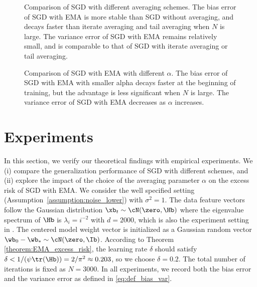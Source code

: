 \documentclass[11pt]{article}
\begin{document}
\begin{figure}[ht]
\centering
{}
\caption{Comparison of SGD with different averaging schemes. The bias error of SGD with EMA is more stable than SGD without averaging, and decays faster than iterate averaging and tail averaging when $N$ is large. The variance error of SGD with EMA remains relatively small, and is comparable to that of SGD with iterate averaging or tail averaging.}
\label{fig:avg}
\end{figure}
\begin{figure}[ht]
\centering
{}
\caption{Comparison of SGD with EMA with different $\alpha$. The bias error of SGD with EMA with smaller alpha decays faster at the beginning of training, but the advantage is less significant when $N$ is large. The variance error of SGD with EMA decreases as $\alpha$ increases.}
\label{fig:alpha}
\end{figure}

\section{Experiments}

In this section, we verify our theoretical findings with empirical experiments.
We (i) compare the generalization performance of SGD with different schemes, and (ii) explore the impact of the choice of the averaging parameter $\alpha$ on the excess risk of SGD with EMA.
We consider the well specified setting (Assumption~\ref{assumption:noise_lower}) with $\sigma^2=1$. The data feature vectors follow the Gaussian distribution $\xb_t\sim\cN(\zero, \Hb)$ where the eigenvalue spectrum of $\Hb$ is $\lambda_i=i^{-2}$ with $d=2000$, which is also the experiment setting in \citet{zou2021benign, wu2022last, li2023risk}. The centered model weight vector is initialized as a Gaussian random vector $\wb_0-\wb_*\sim\cN(\zero, \Ib)$. According to Theorem \ref{theorem:EMA_excess_risk}, the learning rate $\delta$ should satisfy $\delta<1/(\psi\tr(\Hb))=2/\pi^2\approx0.203$, so we choose $\delta=0.2$. The total number of iterations is fixed as $N=3000$. In all experiments, we record both the bias error and the variance error as defined in \eqref{eq:def_bias_var}.
\end{document}
